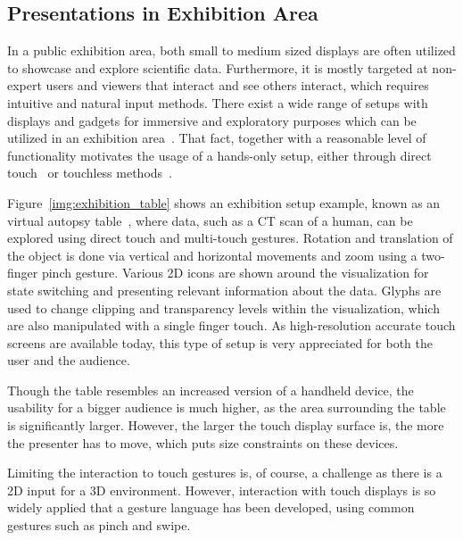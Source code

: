 \documentclass[review,journal]{vgtc}         %
\begin{document}
\subsection{Presentations in Exhibition Area} \label{sec:exhibition}
In a public exhibition area, both small to medium sized displays are often utilized to showcase and explore scientific data.
Furthermore, it is mostly targeted at non-expert users and viewers that interact and see others interact, which requires intuitive and natural input methods.
There exist a wide range of setups with displays and gadgets for immersive and exploratory purposes which can be utilized in an exhibition area~\cite{Laha:2013:VCB:2491367.2491368, conf/egve/KruszynskiL08}.
That fact, together with a reasonable level of functionality motivates the usage of a hands-only setup, either through direct touch~\cite{Klein:2012:DSD:2322389.2322403} or touchless methods~\cite{O'hara:2013:NTP:2442106.2442111}.

Figure~\ref{img:exhibition_table} shows an exhibition setup example, known as an virtual autopsy table~\cite{LRFPY11}, where data, such as a CT scan of a human, can be explored using direct touch and multi-touch gestures.
Rotation and translation of the object is done via vertical and horizontal movements and zoom using a two-finger pinch gesture.
Various 2D icons are shown around the visualization for state switching and presenting relevant information about the data.
Glyphs are used to change clipping and transparency levels within the visualization, which are also manipulated with a single finger touch.
As high-resolution accurate touch screens are available today, this type of setup is very appreciated for both the user and the audience.

Though the table resembles an increased version of a handheld device, the usability for a bigger audience is much higher, as the area surrounding the table is significantly larger.
However, the larger the touch display surface is, the more the presenter has to move, which puts size constraints on these devices.

Limiting the interaction to touch gestures is, of course, a challenge as there is a 2D input for a 3D environment.
However, interaction with touch displays is so widely applied that a gesture language has been developed, using common gestures such as pinch and swipe.
\end{document}
